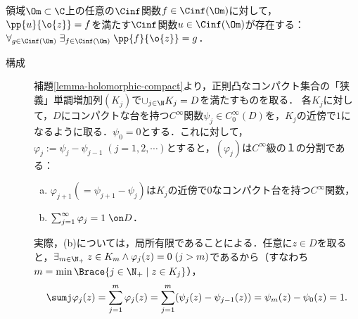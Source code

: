 \documentclass[uplatex, dvipdfmx]{jsreport}
\begin{document}
\begin{theorem}\label{thm-Cauchy-Riemann-operator-is-epic}
    領域$\Om\subset\C$上の任意の$\Cinf$関数$f\in\Cinf(\Om)$に対して，$\pp{u}{\o{z}}=f$を満たす$\Cinf$関数$u\in\Cinf(\Om)$が存在する：$\forall_{g\in\Cinf(\Om)}\;\exists_{f\in\Cinf(\Om)}\;\pp{f}{\o{z}}=g$．
\end{theorem}
\begin{Proof}\mbox{}
    \begin{description}
        \item[構成] 補題\ref{lemma-holomorphic-compact}より，正則凸なコンパクト集合の「狭義」単調増加列$(K_j)$で$\cup_{j\in\N}K_j=D$を満たすものを取る．
        各$K_j$に対して，$D$にコンパクトな台を持つ$C^\infty$関数$\psi_j\in C_0^\infty(D)$を，$K_j$の近傍で$1$になるように取る．$\psi_0=0$とする．これに対して，$\varphi_j:=\psi_j-\psi_{j-1}\;(j=1,2,\cdots)$とすると，$(\varphi_j)$は$C^\infty$級の１の分割である：
        \begin{enumerate}[(a)]
            \item $\varphi_{j+1}(=\psi_{j+1}-\psi_j)$は$K_j$の近傍で$0$なコンパクト台を持つ$C^\infty$関数，
            \item $\sum_{j=1}^\infty\varphi_j=1\;\on D$．
        \end{enumerate}
        実際，(b)については，局所有限であることによる．任意に$z\in D$を取ると，$\exists_{m\in\N_+}\;z\in K_m\land\varphi_j(z)=0\;(j>m)$であるから（すなわち$m=\min\Brace{j\in\N_+\mid z\in K_j}$），\[\sumj\varphi_j(z)=\sum_{j=1}^m\varphi_j(z)=\sum^m_{j=1}(\psi_j(z)-\psi_{j-1}(z))=\psi_m(z)-\psi_0(z)=1.\]


\end{description}
\end{Proof}
\end{document}
